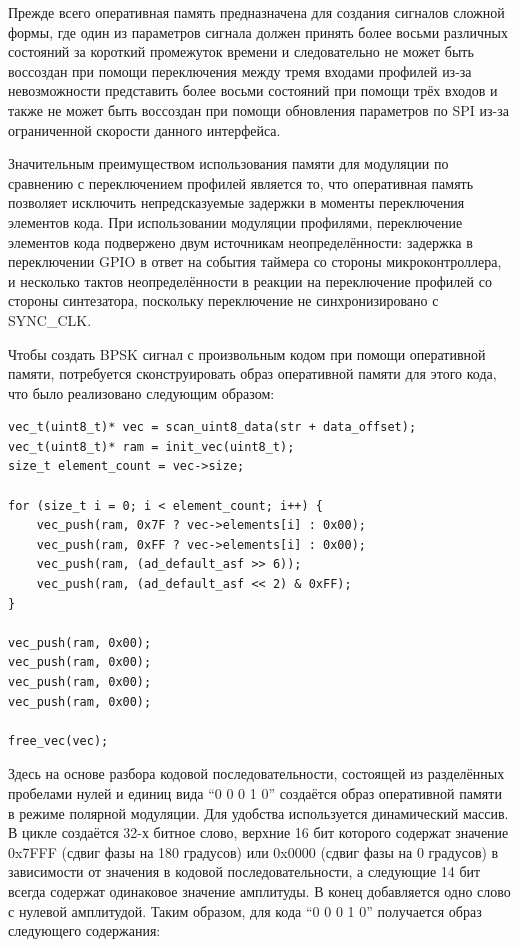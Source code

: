 \documentclass[rusmathsym, eqnumwithinsec, amspack, hyperref]{bomgost}
\begin{document}

Прежде всего оперативная память предназначена для создания сигналов сложной формы, где один из параметров сигнала должен принять более восьми различных состояний за короткий промежуток времени и следовательно не может быть воссоздан при помощи переключения между тремя входами профилей из-за невозможности представить более восьми состояний при помощи трёх входов и также не может быть воссоздан при помощи обновления параметров по SPI из-за ограниченной скорости данного интерфейса.

Значительным преимуществом использования памяти для модуляции по сравнению с переключением профилей является то, что оперативная память позволяет исключить непредсказуемые задержки в моменты переключения элементов кода. При использовании модуляции профилями, переключение элементов кода подвержено двум источникам неопределённости: задержка в переключении GPIO в ответ на события таймера со стороны микроконтроллера, и несколько тактов неопределённости в реакции на переключение профилей со стороны синтезатора, поскольку переключение не синхронизировано с SYNC\_CLK.

Чтобы создать BPSK сигнал с произвольным кодом при помощи оперативной памяти, потребуется сконструировать образ оперативной памяти для этого кода, что было реализовано следующим образом:

\lstset{
	language=c,
	basicstyle=\scriptsize\ttfamily,
	numbers=left,
	stepnumber=1,
	showstringspaces=false,
	tabsize=4,
	breaklines=true,
	breakatwhitespace=false,
	xleftmargin=.1\textwidth, xrightmargin=.1\textwidth,
	belowskip=1em, aboveskip=1em
}
\begin{lstlisting}
vec_t(uint8_t)* vec = scan_uint8_data(str + data_offset);
vec_t(uint8_t)* ram = init_vec(uint8_t);
size_t element_count = vec->size;

for (size_t i = 0; i < element_count; i++) {
	vec_push(ram, 0x7F ? vec->elements[i] : 0x00);
	vec_push(ram, 0xFF ? vec->elements[i] : 0x00);
	vec_push(ram, (ad_default_asf >> 6));
	vec_push(ram, (ad_default_asf << 2) & 0xFF);
}

vec_push(ram, 0x00);
vec_push(ram, 0x00);
vec_push(ram, 0x00);
vec_push(ram, 0x00);

free_vec(vec);
\end{lstlisting}

Здесь на основе разбора кодовой последовательности, состоящей из разделённых пробелами нулей и единиц вида ``0 0 0 1 0'' создаётся образ оперативной памяти в режиме полярной модуляции. Для удобства используется динамический массив. В цикле создаётся 32-х битное слово, верхние 16 бит которого содержат значение 0x7FFF (сдвиг фазы на 180 градусов) или 0x0000 (сдвиг фазы на 0 градусов) в зависимости от значения в кодовой последовательности, а следующие 14 бит всегда содержат одинаковое значение амплитуды. В конец добавляется одно слово с нулевой амплитудой. Таким образом, для кода ``0 0 0 1 0'' получается образ следующего содержания:
\end{document}
